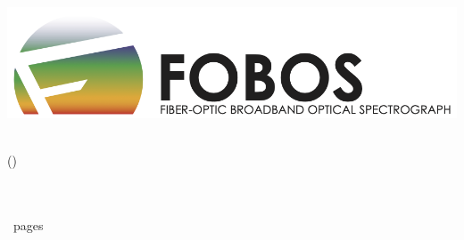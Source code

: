 {\begingroup
\newlength{\drop}
\textheight
\begin{flushleft}
    \includegraphics[width=\textwidth]{figs/logo/FOBOS_LOGO_FINAL.png}

    \vspace{0.5\drop}
    \begin{Spacing}{1.5}
    {\huge \doclongname\\ (\docshortname)}
    \end{Spacing}
    \vfill

    \vfill
    {\Large
    
    }
    \vfill

    {\LARGE \bfseries \docsysnum} \\
    \docreleaseDate{} \\
    \thelastpage\ pages

\end{flushleft}
\vspace*{0.5\drop}
\endgroup}
